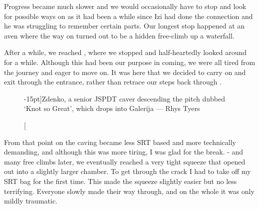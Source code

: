 Progress became much slower and we would occasionally have to stop and look for possible ways on as it had been a while since Izi had done the connection and he was struggling to remember certain parts. Our longest stop happened at an aven where the way on turned out to be a hidden free-climb up a waterfall.

After a while, we reached , where we stopped and half-heartedly looked around for a while. Although this had been our purpose in coming, we were all tired from the journey and eager to move on. It was here that we decided to carry on and exit through the  entrance, rather than retrace our steps back through . 

\begin{figure}[t!]
\checkoddpage \ifoddpage \forcerectofloat \else \forceversofloat \fi
\centering
{}
\caption[][-15pt]{Zdenko, a senior JSPDT caver descending the pitch dubbed `Knot so Great', which drops into Galerija --- Rhys Tyers}
\label{Zdenko16}
\end{figure}
From that point on the caving became less SRT based and more technically demanding, and although this was more tiring, I was glad for the break. - and many free climbs later, we eventually reached a very tight squeeze that opened out into a slightly larger chamber. To get through the crack I had to take off my SRT bag for the first time. This made the squeeze slightly easier but no less terrifying. Everyone slowly made their way through, and on the whole it was only mildly traumatic.

